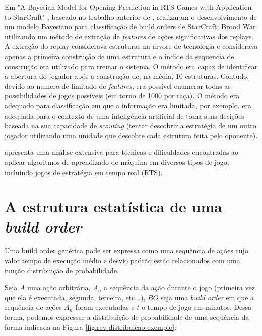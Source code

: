Em "A Bayesian Model for Opening Prediction in RTS Games with Application to StarCraft"  \cite{synnaeve2011bayesian1}, baseado no trabalho anterior de \cite{weber2009data}, realizaram o desenvolvimento de um modelo Bayesiano para classificação de build orders de StarCraft: Brood War utilizando um método de extração de \textit{features} de ações significativas dos replays. A extração do replay considerava estruturas na arvore de tecnologia e considerava apenas a primeira construção de uma estrutura e o índide da sequencia de construção era utilizado para treinar o sistema. O método era capaz de identificar a abertura do jogador após a construção de, na média, 10 estruturas. Contudo, devido ao numero de limitado de \textit{features}, era possível enumerar todas as possibilidades de jogos possíveis (em torno de 1000 por raça). O método era adequado para classificação em que a informação era limitada, por exemplo, era adequada para o contexto de uma inteligência artificial de toma suas decições baseada na sua capacidade de \textit{scouting} (tentar descobrir a estratégia de um outro jogador utilizando uma unidade que descobre cada estrutura feita pelo oponente).

\cite{synnaeve2011bayesian2} apresenta uma análise extensiva para técnicas e dificuldades encontradas ao aplicar algoritmos de aprendizado de máquina em diversos tipos de jogo, incluindo jogos de estratégia em tempo real (RTS).

		\section{A estrutura estatística de uma \textit{build order}}
Uma build order genérica pode ser expressa como uma sequência de ações cujo valor tempo de execução médio e desvio padrão estão relacionados com uma função distribuição de probabilidade.

Seja $A$ uma ação arbitrária, $A_n$ a sequência da ação durante o jogo (primeira vez que ela é executada, segunda, terceira, etc...), $BO$ seja uma \textit{build order} em que a sequência de ações $A_n$ foram executadas e $t$ o tempo de jogo em minutos. Dessa forma, podemos expressar a distribuição de probabilidade de uma sequência da forma indicada na Figura \ref{fig:rev-distribuicao-exemplo}:

